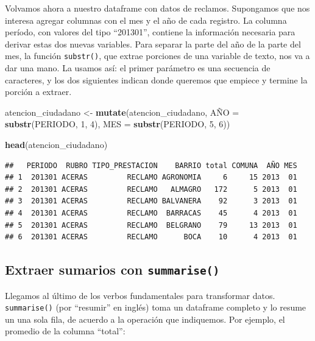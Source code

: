 \documentclass[spanish,]{book}
\newenvironment{Shaded}{\begin{snugshade}}{\end{snugshade}}
\newcommand{\DataTypeTok}[1]{\textcolor[rgb]{0.13,0.29,0.53}{#1}}
\newcommand{\DecValTok}[1]{\textcolor[rgb]{0.00,0.00,0.81}{#1}}
\newcommand{\KeywordTok}[1]{\textcolor[rgb]{0.13,0.29,0.53}{\textbf{#1}}}
\newcommand{\NormalTok}[1]{#1}
\newcommand{\StringTok}[1]{\textcolor[rgb]{0.31,0.60,0.02}{#1}}
\begin{document}
Volvamos ahora a nuestro dataframe con datos de reclamos. Supongamos que nos interesa agregar columnas con el mes y el año de cada registro. La columna período, con valores del tipo ``201301'', contiene la información necesaria para derivar estas dos nuevas variables. Para separar la parte del año de la parte del mes, la función \texttt{substr()}, que extrae porciones de una variable de texto, nos va a dar una mano. La usamos así: el primer parámetro es una secuencia de caracteres, y los dos siguientes indican donde queremos que empiece y termine la porción a extraer.

\begin{Shaded}
\begin{Highlighting}[]
\NormalTok{atencion_ciudadano <-}\StringTok{ }\KeywordTok{mutate}\NormalTok{(atencion_ciudadano,}
\NormalTok{                             AÑ}\DataTypeTok{O =} \KeywordTok{substr}\NormalTok{(PERIODO, }\DecValTok{1}\NormalTok{, }\DecValTok{4}\NormalTok{),}
                             \DataTypeTok{MES =} \KeywordTok{substr}\NormalTok{(PERIODO, }\DecValTok{5}\NormalTok{, }\DecValTok{6}\NormalTok{))}
                                
\KeywordTok{head}\NormalTok{(atencion_ciudadano) }
\end{Highlighting}
\end{Shaded}

\begin{verbatim}
##   PERIODO  RUBRO TIPO_PRESTACION    BARRIO total COMUNA  AÑO MES
## 1  201301 ACERAS         RECLAMO AGRONOMIA     6     15 2013  01
## 2  201301 ACERAS         RECLAMO   ALMAGRO   172      5 2013  01
## 3  201301 ACERAS         RECLAMO BALVANERA    92      3 2013  01
## 4  201301 ACERAS         RECLAMO  BARRACAS    45      4 2013  01
## 5  201301 ACERAS         RECLAMO  BELGRANO    79     13 2013  01
## 6  201301 ACERAS         RECLAMO      BOCA    10      4 2013  01
\end{verbatim}

\hypertarget{extraer-sumarios-con-summarise}{%
\subsection{\texorpdfstring{Extraer sumarios con \texttt{summarise()}}{Extraer sumarios con summarise()}}\label{extraer-sumarios-con-summarise}}

Llegamos al último de los verbos fundamentales para transformar datos. \texttt{summarise()} (por ``resumir'' en inglés) toma un dataframe completo y lo resume un una sola fila, de acuerdo a la operación que indiquemos. Por ejemplo, el promedio de la columna ``total'':
\end{document}

